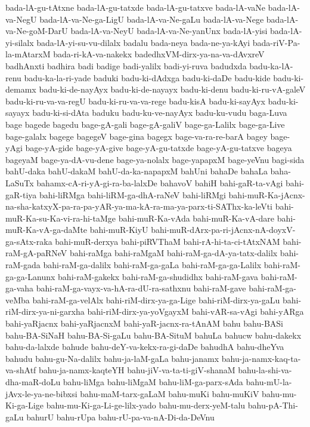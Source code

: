 {bada-lA-gu-tAtxne
bada-lA-gu-tatxde
bada-lA-gu-tatxve
bada-lA-vaNe
bada-lA-va-NegU
bada-lA-va-Ne-ga-LigU
bada-lA-va-Ne-gaLu
bada-lA-va-Nege
bada-lA-va-Ne-goM-DarU
bada-lA-va-NeyU
bada-lA-va-Ne-yanUnx
bada-lA-yisi
bada-lA-yi-silalx
bada-lA-yi-su-vu-dilalx
badalu
bada-neya
bada-ne-ya-kAyi
bada-riV-Pa-la-mAtarxM
bada-ri-kA-va-nakekx
badedhxVM-dirx-ya-na-va-dAvxreV
badhAnxti
badhira
badi
badige
badi-yalilx
badi-yi-ruva
badudxda
badu-ka-lA-renu
badu-ka-la-ri-yade
baduki
badu-ki-dAdxga
badu-ki-daDe
badu-kide
badu-ki-demamx
badu-ki-de-nayAyx
badu-ki-de-nayayx
badu-ki-denu
badu-ki-ru-vA-galeV
badu-ki-ru-va-va-regU
badu-ki-ru-va-va-rege
badu-kisA
badu-ki-sayAyx
badu-ki-sayayx
badu-ki-si-dAta
baduku
badu-ku-ve-nayAyx
badu-ku-vudu
baga-Luva
bage
bagede
bagedu
bage-gA-gali
bage-gA-galiV
bage-ga-Lalilx
bage-ga-Live
bage-galalx
bagege
bagegeV
bage-gina
bagegx
bage-va-ra-re-barA
bagey
bage-yAgi
bage-yA-gide
bage-yA-give
bage-yA-gu-tatxde
bage-yA-gu-tatxve
bageya
bageyaM
bage-ya-dA-vu-dene
bage-ya-nolalx
bage-yapapxM
bage-yeVnu
bagi-sida
bahU-daka
bahU-dakaM
bahU-da-ka-napapxM
bahUni
bahaDe
bahaLa
baha-LaSuTx
bahamx-cA-ri-yA-gi-ra-ba-lalxDe
bahavoV
bahiH
bahi-gaR-ta-vAgi
bahi-gaR-tiya
bahi-liRMga
bahi-liRM-ga-dhA-raNeV
bahi-liRMgi
bahi-muR-Ka-jAcnx-na-sha-katxyX-pa-ra-pa-yAR-ya-ma-kA-ra-ma-ya-parx-ti-SAThx-ka-leVti
bahi-muR-Ka-su-Ka-vi-ra-hi-taMge
bahi-muR-Ka-vAda
bahi-muR-Ka-vA-dare
bahi-muR-Ka-vA-ga-daMte
bahi-muR-KiyU
bahi-muR-dArx-pa-ri-jAcnx-nA-doyxV-ga-sAtx-raka
bahi-muR-derxya
bahi-piRVThaM
bahi-rA-hi-ta-ci-tAtxNAM
bahi-raM-gA-paRNeV
bahi-raMga
bahi-raMgaM
bahi-raM-ga-dA-ya-tatx-dalilx
bahi-raM-gada
bahi-raM-ga-dalilx
bahi-raM-ga-gaLa
bahi-raM-ga-ga-Lalilx
bahi-raM-ga-ga-Lanunx
bahi-raM-gakekx
bahi-raM-ga-shudidhx
bahi-raM-gava
bahi-raM-ga-vaha
bahi-raM-ga-vayx-va-hA-ra-dU-ra-sathxnu
bahi-raM-gave
bahi-raM-ga-veMba
bahi-raM-ga-velAlx
bahi-riM-dirx-ya-ga-Lige
bahi-riM-dirx-ya-gaLu
bahi-riM-dirx-ya-ni-garxha
bahi-riM-dirx-ya-yoVgayxM
bahi-vAR-sa-vAgi
bahi-yARga
bahi-yaRjacnx
bahi-yaRjacnxM
bahi-yaR-jacnx-ra-tAnAM
bahu
bahu-BASi
bahu-BA-SiNaH
bahu-BA-Si-gaLu
bahu-BA-SituM
bahuLa
bahucw
bahu-dakekx
bahu-da-lalxde
bahude
bahu-deY-va-kekx-ra-gi-daDe
bahudhA
bahu-dheYva
bahudu
bahu-gu-Na-dalilx
bahu-ja-laM-gaLa
bahu-janamx
bahu-ja-namx-kaq-ta-va-shAtf
bahu-ja-namx-kaqteYH
bahu-jiV-va-ta-ti-giV-shanaM
bahu-la-shi-va-dha-maR-doLu
bahu-liMga
bahu-liMgaM
bahu-liM-ga-parx-sAda
bahu-mU-la-jAvx-le-ya-ne-bibxsi
bahu-maM-tarx-gaLaM
bahu-muKi
bahu-muKiV
bahu-mu-Ki-ga-Lige
bahu-mu-Ki-ga-Li-ge-lilx-yado
bahu-mu-derx-yeM-talu
bahu-pA-Thi-gaLu
bahurU
bahu-rUpa
bahu-rU-pa-va-nA-Di-da-DeVnu
}

